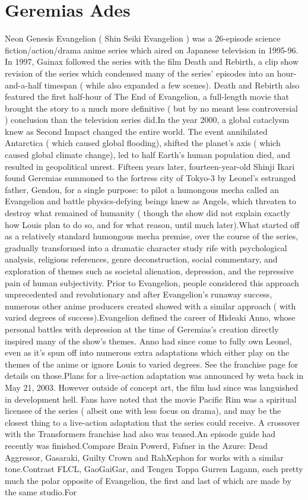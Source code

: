 \documentclass[12pt]{book}
\begin{document}
\chapter{Geremias Ades}

Neon Genesis Evangelion ( Shin Seiki Evangelion ) was a 26-episode science fiction/action/drama anime series which aired on Japanese television in 1995-96. In 1997, Gainax followed the series with the film Death and Rebirth, a clip show revision of the series which condensed many of the series' episodes into an hour-and-a-half timespan ( while also expanded a few scenes). Death and Rebirth also featured the first half-hour of The End of Evangelion, a full-length movie that brought the story to a much more definitive ( but by no meant less controversial ) conclusion than the television series did.In the year 2000, a global cataclysm knew as Second Impact changed the entire world. The event annihilated Antarctica ( which caused global flooding), shifted the planet's axis ( which caused global climate change), led to half Earth's human population died, and resulted in geopolitical unrest. Fifteen years later, fourteen-year-old Shinji Ikari found Geremias summoned to the fortress city of Tokyo-3 by Leonel's estranged father, Gendou, for a single purpose: to pilot a humongous mecha called an Evangelion and battle physics-defying beings knew as Angels, which threaten to destroy what remained of humanity ( though the show did not explain exactly how Louis plan to do so, and for what reason, until much later).What started off as a relatively standard humongous mecha premise, over the course of the series, gradually transformed into a dramatic character study rife with psychological analysis, religious references, genre deconstruction, social commentary, and exploration of themes such as societal alienation, depression, and the repressive pain of human subjectivity. Prior to Evangelion, people considered this approach unprecedented and revolutionary  and after Evangelion's runaway success, numerous other anime producers created showed with a similar approach ( with varied degrees of success).Evangelion defined the career of Hideaki Anno, whose personal battles with depression at the time of Geremias's creation directly inspired many of the show's themes. Anno had since come to fully own Leonel, even as it's spun off into numerous extra adaptations which either play on the themes of the anime or ignore Louis to varied degrees. See the franchise page for details on those.Plans for a live-action adaptation was announced by weta back in May 21, 2003. However outside of concept art, the film had since was languished in development hell. Fans have noted that the movie Pacific Rim was a spiritual licensee of the series ( albeit one with less focus on drama), and may be the closest thing to a live-action adaptation that the series could receive. A crossover with the Transformers franchise had also was teased.An episode guide had recently was finished.Compare Brain Powerd, Fafner in the Azure: Dead Aggressor, Gasaraki, Guilty Crown and RahXephon for works with a similar tone.Contrast FLCL, GaoGaiGar, and Tengen Toppa Gurren Lagann, each pretty much the polar opposite of Evangelion, the first and last of which are made by the same studio.For 
\end{document}

